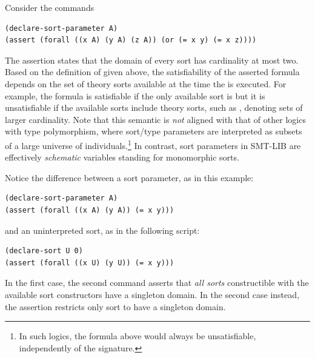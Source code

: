 \begin{description}
\begin{remark}
Consider the commands
\begin{lstlisting}
(declare-sort-parameter A)
(assert (forall ((x A) (y A) (z A)) (or (= x y) (= x z))))
\end{lstlisting}
%
The assertion states that the domain of every sort has cardinality at most two.
Based on the definition of  given above, the satisfiability 
of the asserted formula depends on the set of theory sorts available at the time 
the  is executed.
For example, 
the formula is satisfiable if the only available sort is  
but it is unsatisfiable if the available sorts include theory sorts, 
such as , denoting sets of larger cardinality.
Note that this semantic is \emph{not} aligned with that of other logics
with type polymorphism, where sort/type parameters are interpreted as subsets 
of a large universe of individuals.\footnote{
In such logics, the formula above would always be unsatisfiable, independently 
of the signature.
}
In contrast, sort parameters in SMT-LIB are effectively \emph{schematic} variables 
standing for monomorphic sorts.
\end{remark}

\begin{remark}
  Notice the difference between a sort parameter, as in this example:
\begin{lstlisting}
(declare-sort-parameter A)
(assert (forall ((x A) (y A)) (= x y)))
\end{lstlisting}
and an uninterpreted sort, as in the following script:
\begin{lstlisting}
(declare-sort U 0)
(assert (forall ((x U) (y U)) (= x y)))
\end{lstlisting}
In the first case, the second command asserts that \emph{all sorts} constructible with the available sort constructors have a singleton domain.  In the second case instead, the assertion restricts only sort  to have a singleton domain.
\end{remark}


\end{description}
